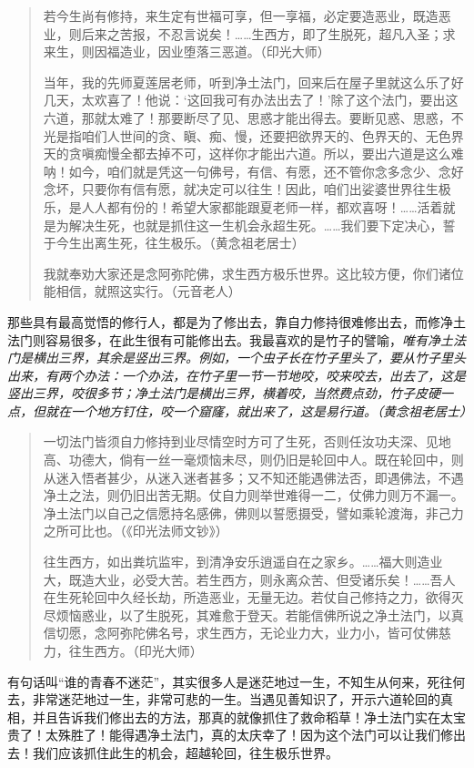 \begin{quotation}
    若今生尚有修持，来生定有世福可享，但一享福，必定要造恶业，既造恶业，则后来之苦报，不忍言说矣！……生西方，即了生脱死，超凡入圣；求来生，则因福造业，因业堕落三恶道。（印光大师）

    当年，我的先师夏莲居老师，听到净土法门，回来后在屋子里就这么乐了好几天，太欢喜了！他说：‘这回我可有办法出去了！’除了这个法门，要出这六道，那就太难了！那要断尽了见、思惑才能出得去。要断见惑、思惑，不光是指咱们人世间的贪、瞋、痴、慢，还要把欲界天的、色界天的、无色界天的贪嗔痴慢全都去掉不可，这样你才能出六道。所以，要出六道是这么难呐！如今，咱们就是凭这一句佛号，有信、有愿，还不管你念多念少、念好念坏，只要你有信有愿，就决定可以往生！因此，咱们出娑婆世界往生极乐，是人人都有份的！希望大家都能跟夏老师一样，都欢喜呀！……活着就是为解决生死，也就是抓住这一生机会永超生死。……我们要下定决心，誓于今生出离生死，往生极乐。（黄念祖老居士）

    我就奉劝大家还是念阿弥陀佛，求生西方极乐世界。这比较方便，你们诸位能相信，就照这实行。（元音老人）
\end{quotation}

那些具有最高觉悟的修行人，都是为了修出去，靠自力修持很难修出去，而修净土法门则容易很多，在此生很有可能修出去。我最喜欢的是竹子的譬喻，\textit{唯有净土法门是横出三界，其余是竖出三界。例如，一个虫子长在竹子里头了，要从竹子里头出来，有两个办法：一个办法，在竹子里一节一节地咬，咬来咬去，出去了，这是竖出三界，咬很多节；净土法门是横出三界，横着咬，当然费点劲，竹子皮硬一点，但就在一个地方钉住，咬一个窟窿，就出来了，这是易行道。（黄念祖老居士）}

\begin{quotation}
    一切法门皆须自力修持到业尽情空时方可了生死，否则任汝功夫深、见地高、功德大，倘有一丝一毫烦恼未尽，则仍旧是轮回中人。既在轮回中，则从迷入悟者甚少，从迷入迷者甚多；又不知还能遇佛法否，即遇佛法，不遇净土之法，则仍旧出苦无期。仗自力则举世难得一二，仗佛力则万不漏一。净土法门以自己之信愿持名感佛，佛则以誓愿摄受，譬如乘轮渡海，非己力之所可比也。（《印光法师文钞》）

    往生西方，如出粪坑监牢，到清净安乐逍遥自在之家乡。……福大则造业大，既造大业，必受大苦。若生西方，则永离众苦、但受诸乐矣！……吾人在生死轮回中久经长劫，所造恶业，无量无边。若仗自己修持之力，欲得灭尽烦恼惑业，以了生脱死，其难愈于登天。若能信佛所说之净土法门，以真信切愿，念阿弥陀佛名号，求生西方，无论业力大，业力小，皆可仗佛慈力，往生西方。（印光大师）
\end{quotation}

有句话叫“谁的青春不迷茫”，其实很多人是迷茫地过一生，不知生从何来，死往何去，非常迷茫地过一生，非常可悲的一生。当遇见善知识了，开示六道轮回的真相，并且告诉我们修出去的方法，那真的就像抓住了救命稻草！净土法门实在太宝贵了！太殊胜了！能得遇净土法门，真的太庆幸了！因为这个法门可以让我们修出去！我们应该抓住此生的机会，超越轮回，往生极乐世界。

